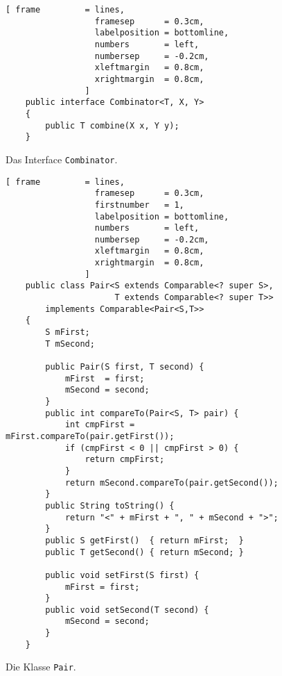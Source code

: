 \begin{enumerate}
\begin{figure}[!h]
\centering
\begin{Verbatim}[ frame         = lines, 
                  framesep      = 0.3cm, 
                  labelposition = bottomline,
                  numbers       = left,
                  numbersep     = -0.2cm,
                  xleftmargin   = 0.8cm,
                  xrightmargin  = 0.8cm,
                ]
    public interface Combinator<T, X, Y>
    {
        public T combine(X x, Y y);
    }
\end{Verbatim}
\vspace*{-0.3cm}
\caption{Das Interface \texttt{Combinator}.}
\label{fig:Combinator.java}
\end{figure}
\end{enumerate}

\begin{figure}[!ht]
\centering
\begin{Verbatim}[ frame         = lines, 
                  framesep      = 0.3cm, 
                  firstnumber   = 1,
                  labelposition = bottomline,
                  numbers       = left,
                  numbersep     = -0.2cm,
                  xleftmargin   = 0.8cm,
                  xrightmargin  = 0.8cm,
                ]
    public class Pair<S extends Comparable<? super S>, 
                      T extends Comparable<? super T>> 
        implements Comparable<Pair<S,T>>
    {
        S mFirst;
        T mSecond;
        
        public Pair(S first, T second) {
            mFirst  = first;
            mSecond = second;
        }
        public int compareTo(Pair<S, T> pair) {
            int cmpFirst = mFirst.compareTo(pair.getFirst());
            if (cmpFirst < 0 || cmpFirst > 0) {
                return cmpFirst;
            }
            return mSecond.compareTo(pair.getSecond());
        }
        public String toString() {
            return "<" + mFirst + ", " + mSecond + ">";
        }
        public S getFirst()  { return mFirst;  }
        public T getSecond() { return mSecond; }
    
        public void setFirst(S first) { 
            mFirst = first; 
        }
        public void setSecond(T second) { 
            mSecond = second; 
        }
    }
\end{Verbatim}
\vspace*{-0.3cm}
\caption{Die Klasse \texttt{Pair}.}
\label{fig:Pair.java}
\end{figure}

